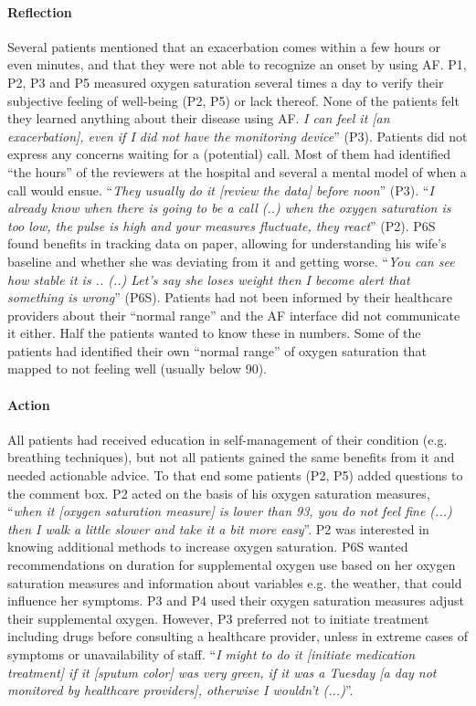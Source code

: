\paragraph{Reflection} 
Several patients mentioned that an exacerbation comes within a few hours or even minutes, and that they were not able to recognize an onset by using AF. P1, P2, P3 and P5 measured oxygen saturation several times a day to verify their subjective feeling of well-being (P2, P5) or lack thereof. None of the patients felt they learned anything about their disease using AF. \textit{I can feel it [an exacerbation], even if I did not have the monitoring device}” (P3). Patients did not express any concerns waiting for a (potential) call. Most of them had identified “the hours” of the reviewers at the hospital and several a mental model of when a call would ensue. “\textit{They usually do it [review the data] before noon}” (P3). “\textit{I already know when there is going to be a call (..) when the oxygen saturation is too low, the pulse is high and your measures fluctuate, they react}” (P2). P6S found benefits in tracking data on paper, allowing for understanding his wife’s baseline and whether she was deviating from it and getting worse. “\textit{You can see how stable it is .. (..) Let’s say she loses weight then I become alert that something is wrong}” (P6S). Patients had not been informed by their healthcare providers about their “normal range” and the AF interface did not communicate it either. Half the patients wanted to know these in numbers. Some of the patients had identified their own “normal range” of oxygen saturation that mapped to not feeling well (usually below 90). 

\paragraph{Action} 
All patients had received education in self-management of their condition (e.g. breathing techniques), but not all patients gained the same benefits from it and needed actionable advice. To that end some patients (P2, P5) added questions to the comment box. P2 acted on the basis of his oxygen saturation measures, “\textit{when it [oxygen saturation measure] is lower than 93, you do not feel fine (...) then I walk a little slower and take it a bit more easy}”. P2 was interested in knowing additional methods to increase oxygen saturation. P6S wanted recommendations on duration for supplemental oxygen use based on her oxygen saturation measures and information about variables e.g. the weather, that could influence her symptoms. P3 and P4 used their oxygen saturation measures adjust their supplemental oxygen. However, P3 preferred not to initiate treatment including drugs before consulting a healthcare provider, unless in extreme cases of symptoms or unavailability of staff. “\textit{I might to do it [initiate medication treatment] if it [sputum color] was very green, if it was a Tuesday [a day not monitored by healthcare providers], otherwise I wouldn’t (...)}”.

